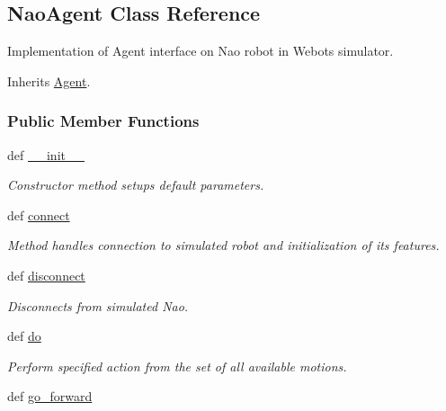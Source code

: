 \hypertarget{class_nao_agent_1_1_nao_agent}{\subsection{Nao\+Agent Class Reference}
\label{class_nao_agent_1_1_nao_agent}
}


Implementation of Agent interface on Nao robot in Webots simulator.  




Inherits \hyperlink{class_agent_1_1_agent}{Agent}.

\subsubsection*{Public Member Functions}
\begin{DoxyCompactItemize}
\item 
\hypertarget{class_nao_agent_1_1_nao_agent_ac775ee34451fdfa742b318538164070e}{def \hyperlink{class_nao_agent_1_1_nao_agent_ac775ee34451fdfa742b318538164070e}{\+\_\+\+\_\+init\+\_\+\+\_\+}}\label{class_nao_agent_1_1_nao_agent_ac775ee34451fdfa742b318538164070e}

\begin{DoxyCompactList}\small\item\em Constructor method setups default parameters. \end{DoxyCompactList}\item 
def \hyperlink{class_nao_agent_1_1_nao_agent_a0f3e881a92d7a1b4d6d07d9e63180c98}{connect}
\begin{DoxyCompactList}\small\item\em Method handles connection to simulated robot and initialization of its features. \end{DoxyCompactList}\item 
\hypertarget{class_nao_agent_1_1_nao_agent_afab97b4023d6e30d95344406b3655983}{def \hyperlink{class_nao_agent_1_1_nao_agent_afab97b4023d6e30d95344406b3655983}{disconnect}}\label{class_nao_agent_1_1_nao_agent_afab97b4023d6e30d95344406b3655983}

\begin{DoxyCompactList}\small\item\em Disconnects from simulated Nao. \end{DoxyCompactList}\item 
def \hyperlink{class_nao_agent_1_1_nao_agent_a412db3f49e4869fa4cb87535dcc77caf}{do}
\begin{DoxyCompactList}\small\item\em Perform specified action from the set of all available motions. \end{DoxyCompactList}\item 
\hypertarget{class_nao_agent_1_1_nao_agent_a74f88e9c727035ad050d4a1b5e16eb5f}{def \hyperlink{class_nao_agent_1_1_nao_agent_a74f88e9c727035ad050d4a1b5e16eb5f}{go\+\_\+forward}}\label{class_nao_agent_1_1_nao_agent_a74f88e9c727035ad050d4a1b5e16eb5f}


\end{DoxyCompactItemize}
